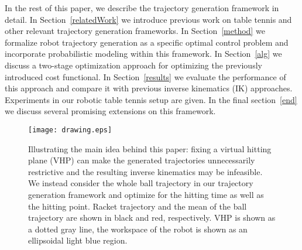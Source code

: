 In the rest of this paper, we describe the trajectory generation framework in detail. In Section~\ref{relatedWork} we introduce previous work on table tennis and other relevant trajectory generation frameworks. In Section~\ref{method} we formalize robot trajectory generation as a specific optimal control problem and incorporate probabilistic modeling within this framework. In Section~\ref{alg} we discuss a two-stage optimization approach for optimizing the previously introduced cost functional. In Section~\ref{results} we evaluate the performance of this approach and compare it with previous inverse kinematics (IK) approaches. Experiments in our robotic table tennis setup are given. In the final section~\ref{end} we discuss several promising extensions on this framework. %

\begin{figure}[t!]
\centering
\texttt{[image: drawing.eps]}			
\caption{Illustrating the main idea behind this paper: fixing a virtual hitting plane (VHP) can make the generated trajectories unnecessarily restrictive and the resulting inverse kinematics may be infeasible. We instead consider the whole ball trajectory in our trajectory generation framework and optimize for the hitting time as well as the hitting point. Racket trajectory and the mean of the ball trajectory are shown in black and red, respectively. VHP is shown as a dotted gray line, the workspace of the robot is shown as an ellipsoidal light blue region.}
\label{mainIdea}
\end{figure}